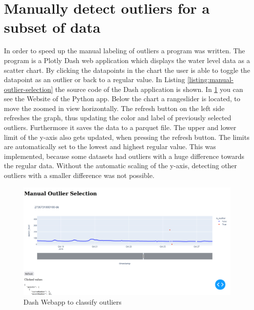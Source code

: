 \section{Manually detect outliers for a subset of data}
In order to speed up the manual labeling of outliers a program was written. The program is a Plotly  Dash web application which displays the water level data as a scatter chart. 
By clicking the datapoints in the chart the user is able to toggle the datapoint as an outlier or back to a regular value. 
In Listing \ref{listing:manual-outlier-selection} the source code of the Dash application is shown. 
In \ref{figure:manual-outlier-selection} you can see the Website of the Python app. Below the chart a rangeslider is located, to move the zoomed in view horizontally. 
The refresh button on the left side refreshes the graph, thus updating the color and label of previously selected outliers. Furthermore it saves the data to a parquet file.
The upper and lower limit of the y-axis also gets updated, when pressing the refresh button. 
The limits are automatically set to the lowest and highest regular value. 
This was implemented, because some datasets had outliers with a huge difference towards the regular data. 
Without the automatic scaling of the y-axis, detecting other outliers with a smaller difference was not possible.
\begin{figure}[H]
    \centering
    \includegraphics[width=\textwidth]{./pics/manual-outlier-selection.png}
    \caption{Dash Webapp to classify outliers}
    \label{figure:manual-outlier-selection}
\end{figure}

